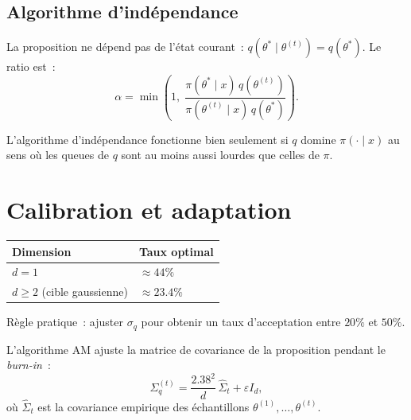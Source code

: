 \subsection{Algorithme d'ind\'ependance}

\begin{definition}
La proposition ne d\'epend pas de l'\'etat courant~:
$q(\theta^* \mid \theta^{(t)}) = q(\theta^*)$. Le ratio est~:
\[
  \alpha = \min\!\left(1,\;
  \frac{\pi(\theta^* \mid x)\,q(\theta^{(t)})}
       {\pi(\theta^{(t)} \mid x)\,q(\theta^*)}\right).
\]
\end{definition}

\begin{attention}[title=\textbf{Condition de domination}]
L'algorithme d'ind\'ependance fonctionne bien seulement si $q$ domine
$\pi(\cdot \mid x)$ au sens o\`u les queues de $q$ sont au moins aussi
lourdes que celles de $\pi$.
\end{attention}

\section{Calibration et adaptation}

\begin{formules}[title=\textbf{Taux d'acceptation optimal}]
\begin{center}
\renewcommand{\arraystretch}{1.3}
\begin{tabular}{ll}
\toprule
\textbf{Dimension} & \textbf{Taux optimal} \\
\midrule
$d = 1$ & $\approx 44\%$ \\
$d \geq 2$ (cible gaussienne) & $\approx 23.4\%$ \\
\bottomrule
\end{tabular}
\end{center}
R\`egle pratique~: ajuster $\sigma_q$ pour obtenir un taux d'acceptation
entre $20\%$ et $50\%$.
\end{formules}

\begin{definition}
L'algorithme AM ajuste la matrice de covariance de la proposition
pendant le \textit{burn-in}~:
\[
  \Sigma_q^{(t)} = \frac{2.38^2}{d}\,\hat{\Sigma}_t + \varepsilon I_d,
\]
o\`u $\hat{\Sigma}_t$ est la covariance empirique des \'echantillons
$\theta^{(1)}, \ldots, \theta^{(t)}$.
\end{definition}

